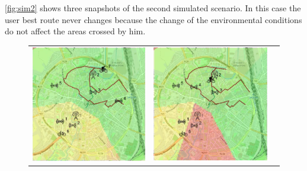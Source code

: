 \noindent \autoref{fig:sim2} shows three snapshots of the second simulated scenario.
In this case the user best route never changes because the change of the environmental conditions do not affect the areas crossed by him.
% 
\begin{figure}[h]
    \centering
    \begin{tabular}{lll}
         \includegraphics[scale=0.42]{figures/sim2snap1.png}  &
         \includegraphics[scale=0.42]{figures/sim2snap2.png} &

\end{tabular}
\end{figure}
